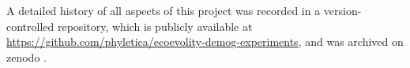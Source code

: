 A detailed history of all aspects of this project was recorded in a
version-controlled repository, which is publicly available at
\url{https://github.com/phyletica/ecoevolity-demog-experiments},
and was archived on zenodo
\citep[\url{https://doi.org/10.5281/zenodo.3319992};][]{Oaks2019CodemogZenodo}.
